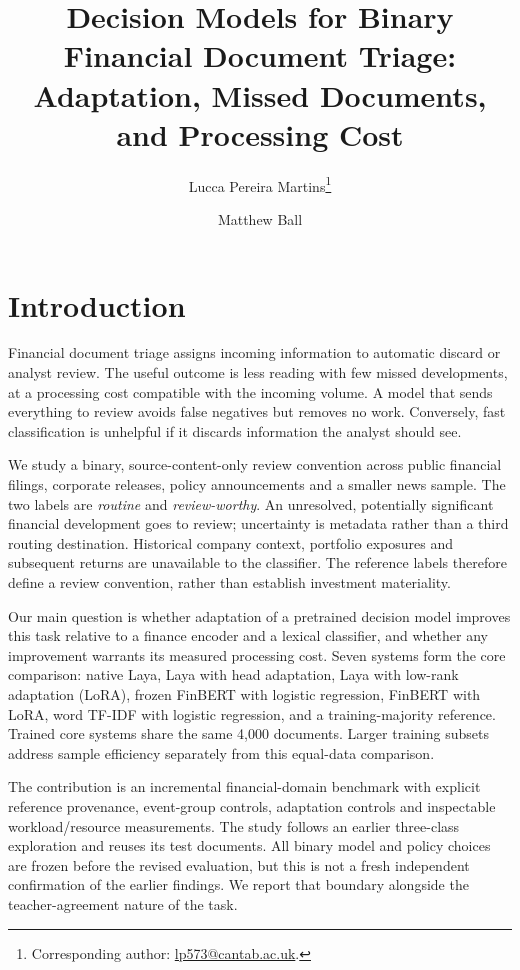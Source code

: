 \documentclass[11pt,a4paper]{article}
\title{Decision Models for Binary Financial Document Triage:\\
Adaptation, Missed Documents, and Processing Cost}
\author{Lucca Pereira Martins\thanks{Corresponding author:
 \href{mailto:lp573@cantab.ac.uk}{lp573@cantab.ac.uk}.} \and Matthew Ball}
\date{}
\begin{document}
\maketitle
\begin{abstract}

\end{abstract}

\section{Introduction}
Financial document triage assigns incoming information to automatic discard or
analyst review. The useful outcome is less reading with few missed developments,
at a processing cost compatible with the incoming volume. A model that sends
everything to review avoids false negatives but removes no work. Conversely,
fast classification is unhelpful if it discards information the analyst should see.

We study a binary, source-content-only review convention across public financial
filings, corporate releases, policy announcements and a smaller news sample.
The two labels are \emph{routine} and \emph{review-worthy}. An unresolved,
potentially significant financial development goes to review; uncertainty is
metadata rather than a third routing destination. Historical company context,
portfolio exposures and subsequent returns are unavailable to the classifier.
The reference labels therefore define a review convention, rather than establish
investment materiality.

Our main question is whether adaptation of a pretrained decision model improves
this task relative to a finance encoder and a lexical classifier, and whether
any improvement warrants its measured processing cost. Seven systems form the
core comparison: native Laya, Laya with head adaptation, Laya with low-rank
adaptation (LoRA), frozen FinBERT with logistic regression, FinBERT with LoRA,
word TF-IDF with logistic regression, and a training-majority reference.
Trained core systems share the same 4,000 documents. Larger training subsets
address sample efficiency separately from this equal-data comparison.

The contribution is an incremental financial-domain benchmark with explicit
reference provenance, event-group controls, adaptation controls and inspectable
workload/resource measurements. The study follows an earlier three-class
exploration and reuses its test documents. All binary model and policy choices
are frozen before the revised evaluation, but this is not a fresh independent
confirmation of the earlier findings. We report that boundary alongside the
teacher-agreement nature of the task.
\end{document}

